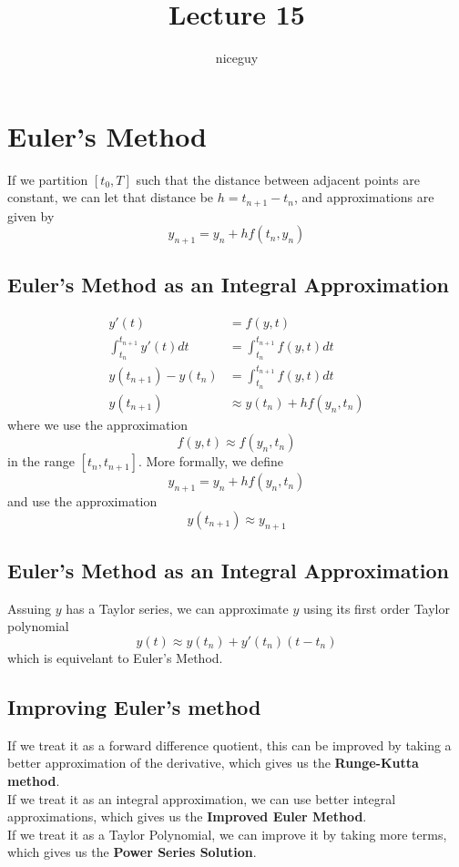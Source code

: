 \documentclass[12pt]{article}
\title{Lecture 15}
\author{niceguy}
\begin{document}
\maketitle

\section{Euler's Method}
If we partition $[t_0,T]$ such that the distance between adjacent points are constant, we can let that distance be $h = t_{n+1} - t_n$, and approximations are given by
$$y_{n+1} = y_n + hf(t_n,y_n)$$

\subsection{Euler's Method as an Integral Approximation}
\begin{align*}
	y'(t) &= f(y,t) \\
	\int_{t_n}^{t_{n+1}} y'(t) dt &= \int_{t_n}^{t_{n+1}} f(y,t) dt \\
	y(t_{n+1}) - y(t_n) &= \int_{t_n}^{t_{n+1}} f(y,t) dt \\
	y(t_{n+1}) &\approx y(t_n) + hf(y_n,t_n)
\end{align*}
where we use the approximation
$$f(y,t) \approx f(y_n,t_n)$$
in the range $[t_n,t_{n+1}]$. More formally, we define
$$y_{n+1} = y_n + hf(y_n,t_n)$$
and use the approximation
$$y(t_{n+1}) \approx y_{n+1}$$

\subsection{Euler's Method as an Integral Approximation}
Assuing $y$ has a Taylor series, we can approximate $y$ using its first order Taylor polynomial
$$y(t) \approx y(t_n) + y'(t_n)(t-t_n)$$
which is equivelant to Euler's Method.

\subsection{Improving Euler's method}
If we treat it as a forward difference quotient, this can be improved by taking a better approximation of the derivative, which gives us the \textbf{Runge-Kutta method}. \\
If we treat it as an integral approximation, we can use better integral approximations, which gives us the \textbf{Improved Euler Method}. \\
If we treat it as a Taylor Polynomial, we can improve it by taking more terms, which gives us the \textbf{Power Series Solution}.
\end{document}
